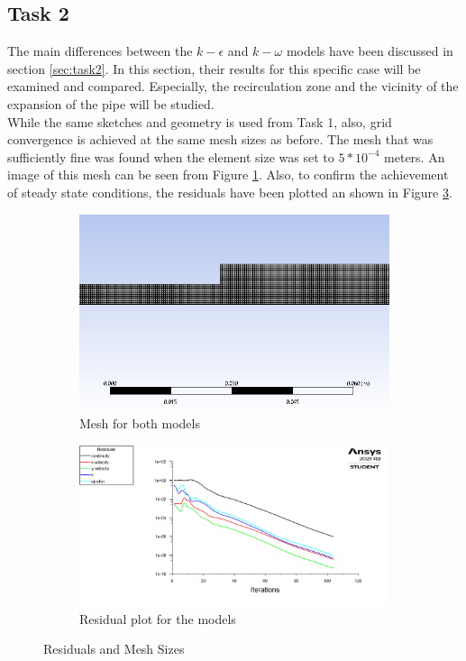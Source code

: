 \subsection{Task 2}
\label{sec:task2results}


The main differences between the $k-\epsilon$ and $k-\omega$ models have been discussed in section \ref{sec:task2}. In this section, their results for this specific case will be examined and compared. Especially, the recirculation zone and the vicinity of the expansion of the pipe will be studied.\\

\noindent While the same sketches and geometry is used from Task 1, also, grid convergence is achieved at the same mesh sizes as before. The mesh that was sufficiently fine was found when the element size was set to $5*10^{-4}$ meters. An image of this mesh can be seen from Figure \ref{fig:task2mesh}. Also, to confirm the achievement of steady state conditions, the residuals have been plotted an shown in Figure \ref{fig:task2_residuals}.

\begin{figure}[H]
    \centering
    \begin{subfigure}{.45\textwidth}
    \centering
    \includegraphics[width=.95\linewidth]{images/task2/task2-1/task2_mesh.png}
    \caption{Mesh for both models}
    \label{fig:task2mesh}
    \end{subfigure}
\hfill
\begin{subfigure}{.45\textwidth}
    \centering
    \includegraphics[width=.95\linewidth]{images/task2/task2-1/task2_1residuals.png}
    \caption{Residual plot for the models}
    \label{fig:task2_residuals}
\end{subfigure}
    
    \hfill
    \caption{Residuals and Mesh Sizes}
\end{figure}

